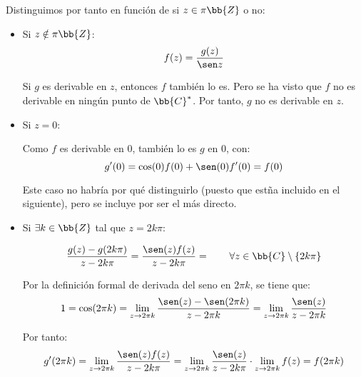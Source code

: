 \documentclass[12pt]{article}
\begin{document}
\begin{ejercicio}[3 puntos]
        Distinguimos por tanto en función de si $z\in \pi\bb{Z}$ o no:
        \begin{itemize}

            \item Si $z\notin \pi\bb{Z}$:
            \begin{equation*}
                f(z)=\dfrac{g(z)}{\sen z}
            \end{equation*}

            Si $g$ es derivable en $z$, entonces $f$ también lo es. Pero se ha visto que $f$ no es derivable en ningún punto de $\bb{C}^*$. Por tanto, $g$ no es derivable en $z$.

            \item Si $z=0$:
            
            Como $f$ es derivable en $0$, también lo es $g$ en $0$, con:
            \begin{equation*}
                g'(0) = \cos(0)f(0) + \sen(0)f'(0) = f(0)
            \end{equation*}
            \begin{observacion}
            Este caso no habría por qué distinguirlo (puesto que estña incluido en el siguiente), pero se incluye por ser el más directo.
            \end{observacion}

            \item Si $\exists k\in \bb{Z}$ tal que $z=2k\pi$:
            
            \begin{equation*}
                \dfrac{g(z)-g(2k\pi)}{z-2k\pi} = \dfrac{\sen(z)f(z)}{z-2k\pi}= \qquad \forall z\in \bb{C}\setminus \{2k\pi\}
            \end{equation*}

            Por la definición formal de derivada del seno en $2\pi k$, se tiene que:
            \begin{equation*}
                1 = \cos(2\pi k) = \lim_{z\to 2\pi k}\dfrac{\sen(z)-\sen(2\pi k)}{z-2\pi k}
                = \lim_{z\to 2\pi k}\dfrac{\sen(z)}{z-2\pi k}
            \end{equation*}

            Por tanto:
            \begin{equation*}
                g'(2\pi k) = \lim_{z\to 2\pi k}\dfrac{\sen(z)f(z)}{z-2k\pi}
                = \lim_{z\to 2\pi k}\dfrac{\sen(z)}{z-2k\pi}\cdot \lim_{z\to 2\pi k} f(z)
                = f(2\pi k)
            \end{equation*}


\end{itemize}
\end{ejercicio}
\end{document}
